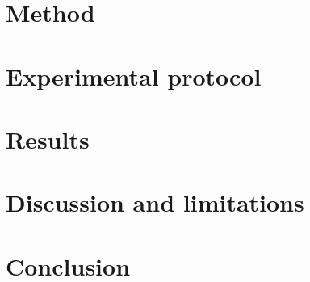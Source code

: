 \documentclass[10pt]{article}
\theoremstyle{plain}
\theoremstyle{definition}
\begin{document}
\section{Method}\label{sec:method}

\FloatBarrier

\section{Experimental protocol}\label{sec:protocol}

\FloatBarrier

\section{Results}\label{sec:results}

\FloatBarrier

\section{Discussion and limitations}\label{sec:discussion}

\FloatBarrier

\section{Conclusion}\label{sec:conclusion}







\appendix

\end{document}
